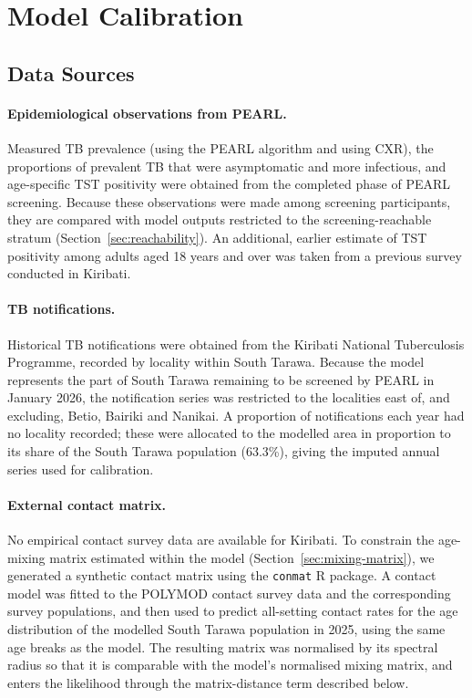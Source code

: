 \documentclass[11pt]{article}
\begin{document}
\section{Model Calibration}

\subsection{Data Sources}
\label{sec:calib-data}

\paragraph{Epidemiological observations from PEARL.}
Measured TB prevalence (using the PEARL algorithm and using CXR), the proportions of prevalent TB that were asymptomatic and more infectious, and age-specific TST positivity were obtained from the completed phase of PEARL screening. Because these observations were made among screening participants, they are compared with model outputs restricted to the screening-reachable stratum (Section~\ref{sec:reachability}). An additional, earlier estimate of TST positivity among adults aged 18 years and over was taken from a previous survey conducted in Kiribati.

\paragraph{TB notifications.}
Historical TB notifications were obtained from the Kiribati National Tuberculosis Programme, recorded by locality within South Tarawa. Because the model represents the part of South Tarawa remaining to be screened by PEARL in January 2026, the notification series was restricted to the localities east of, and excluding, Betio, Bairiki and Nanikai. A proportion of notifications each year had no locality recorded; these were allocated to the modelled area in proportion to its share of the South Tarawa population (63.3\%), giving the imputed annual series used for calibration.

\paragraph{External contact matrix.}
No empirical contact survey data are available for Kiribati. To constrain the age-mixing matrix estimated within the model (Section~\ref{sec:mixing-matrix}), we generated a synthetic contact matrix using the \texttt{conmat} R package. A contact model was fitted to the POLYMOD contact survey data and the corresponding survey populations, and then used to predict all-setting contact rates for the age distribution of the modelled South Tarawa population in 2025, using the same age breaks as the model. The resulting matrix was normalised by its spectral radius so that it is comparable with the model's normalised mixing matrix, and enters the likelihood through the matrix-distance term described below.
\end{document}
